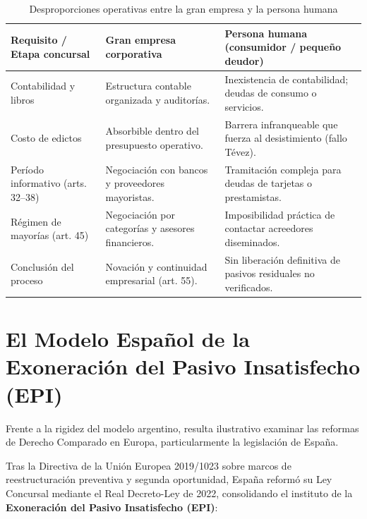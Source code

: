 \documentclass[12pt,oneside]{book}
\begin{document}
\begin{table}[H]
\centering
\caption{Desproporciones operativas entre la gran empresa y la persona humana}
\renewcommand{\arraystretch}{1.25}
\begin{tabularx}{\textwidth}{
    >{\raggedright\arraybackslash}p{}
    >{\raggedright\arraybackslash}X
    >{\raggedright\arraybackslash}X
}
\toprule
\textbf{Requisito / Etapa concursal} &
\textbf{Gran empresa corporativa} &
\textbf{Persona humana (consumidor / pequeño deudor)} \\
\midrule
Contabilidad y libros &
Estructura contable organizada y auditorías. &
Inexistencia de contabilidad; deudas de consumo o servicios. \\
Costo de edictos &
Absorbible dentro del presupuesto operativo. &
Barrera infranqueable que fuerza al desistimiento (fallo Tévez). \\
Período informativo (arts. 32--38) &
Negociación con bancos y proveedores mayoristas. &
Tramitación compleja para deudas de tarjetas o prestamistas. \\
Régimen de mayorías (art. 45) &
Negociación por categorías y asesores financieros. &
Imposibilidad práctica de contactar acreedores diseminados. \\
Conclusión del proceso &
Novación y continuidad empresarial (art. 55). &
Sin liberación definitiva de pasivos residuales no verificados. \\
\bottomrule
\end{tabularx}
\end{table}

\section{El Modelo Español de la Exoneración del Pasivo Insatisfecho (EPI)}

Frente a la rigidez del modelo argentino, resulta ilustrativo examinar las reformas de Derecho Comparado en Europa, particularmente la legislación de España.

Tras la Directiva de la Unión Europea 2019/1023 sobre marcos de reestructuración preventiva y segunda oportunidad, España reformó su Ley Concursal mediante el Real Decreto-Ley de 2022, consolidando el instituto de la \textbf{Exoneración del Pasivo Insatisfecho (EPI)}:
\end{document}
